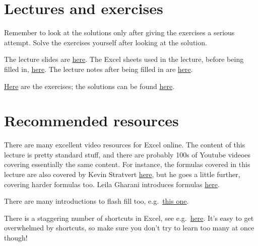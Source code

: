 \documentclass[
  letterpaper,
  DIV=11,
  numbers=noendperiod]{scrreprt}
\begin{document}
\hypertarget{lectures-and-exercises}{%
\section{Lectures and exercises}\label{lectures-and-exercises}}

Remember to look at the solutions only after giving the exercises a
serious attempt. Solve the exercises yourself after looking at the
solution.

The lecture slides are
\href{https://rawcdn.githack.com/BI-DS/ELE-3915/65f16fba2d7ce0fe0fb7fc248d6cf812bb9ba321/slides/lecture01.html}{here}.
The Excel sheets used in the lecture, before being filled in,
\href{https://github.com/BI-DS/ELE-3915/blob/main/slides/lecture01.xlsx}{here}.
The lecture notes after being filled in are
\href{https://github.com/BI-DS/ELE-3915/blob/main/slides/lecture01_solutions.xlsx}{here}.

\href{https://github.com/BI-DS/ELE-3915/blob/main/exercises/exercises01.xlsx}{Here}
are the exercises; the solutions can be found
\href{https://github.com/BI-DS/ELE-3915/blob/main/exercises/exercises01_solutions.xlsx}{here}.

\hypertarget{recommended-resources}{%
\section{Recommended resources}\label{recommended-resources}}

There are many excellent video resources for Excel online. The content
of this lecture is pretty standard stuff, and there are probably 100s of
Youtube videoes covering essentially the same content. For instance, the
formulas covered in this lecture are also covered by Kevin Stratvert
\href{https://www.youtube.com/watch?v=Jl0Qk63z2ZY\&ab_channel=KevinStratvert}{here},
but he goes a little further, covering harder formulas too. Leila
Gharani introduces formulas
\href{https://www.youtube.com/watch?v=y1126PQ5zRU\&ab_channel=LeilaGharani}{here}.

There are many introductions to flash fill too,
e.g.~\href{https://www.youtube.com/watch?v=1KimYFzET1w\&ab_channel=LeilaGharani}{this
one}.

There is a staggering number of shortcuts in Excel, see
e.g.~\href{https://support.microsoft.com/en-us/office/keyboard-shortcuts-in-excel-1798d9d5-842a-42b8-9c99-9b7213f0040f}{here}.
It's easy to get overwhelmed by shortcuts, so make sure you don't try to
learn too many at once though!
\end{document}
